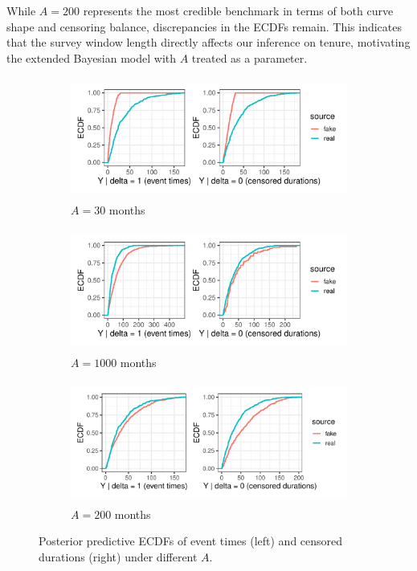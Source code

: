 While $A=200$ represents the most credible benchmark in terms of both curve shape and censoring balance, discrepancies in the ECDFs remain. This indicates that the survey window length directly affects our inference on tenure, motivating the extended Bayesian model with $A$ treated as a parameter.
\begin{figure}[H]
\centering
\begin{subfigure}[t]{0.8\textwidth}
  \centering
  \includegraphics[height=4cm,width=\linewidth]{images/ppc_two_a30.pdf}   %
  \caption{{\small $A=30$ months}}
  \label{fig:ppc_a30}
\end{subfigure}
\begin{subfigure}[t]{0.8\textwidth}
  \centering
  \includegraphics[height=4cm,width=\linewidth]{images/ppc_two_a1000.pdf}   %
  \caption{{\small $A=1000$ months}}
  \label{fig:ppc_a1000}
\end{subfigure}
\begin{subfigure}[t]{0.8\textwidth}
  \centering
  \includegraphics[height=4cm,width=\linewidth]{images/ppc_two_a200.pdf}   %
  \caption{{\small $A=200$ months}}
  \label{fig:ppc_a200}
\end{subfigure}
\caption{{\small Posterior predictive ECDFs of event times (left) and censored durations (right) under different $A$.}}
\label{fig:ppc-A30}
\end{figure}
